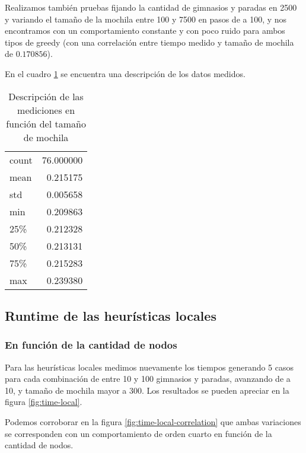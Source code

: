 Realizamos también pruebas fijando la cantidad de gimnasios y paradas en 2500 y variando el tamaño de la mochila entre 100 y 7500 en pasos de a 100, y nos encontramos con un comportamiento constante y con poco ruido para ambos tipos de greedy (con una correlación entre tiempo medido y tamaño de mochila de $0.170856$).

En el cuadro \ref{tab:time-greedy-moch} se encuentra una descripción de los datos medidos.

\begin{table}[H]
    \begin{center}
        \begin{tabular}{| l r |}
            \hline
            count  & 76.000000 \\
            mean   &  0.215175 \\
            std    &  0.005658 \\
            min    &  0.209863 \\
            25\%   &  0.212328 \\
            50\%   &  0.213131 \\
            75\%   &  0.215283 \\
            max    &  0.239380 \\
            \hline
        \end{tabular}
        \caption{Descripción de las mediciones en función del tamaño de mochila}\label{tab:time-greedy-moch}
    \end{center}
\end{table}

\subsection{Runtime de las heurísticas locales}

\subsubsection{En función de la cantidad de nodos}

Para las heurísticas locales medimos nuevamente los tiempos generando 5 casos para cada combinación de entre 10 y 100 gimnasios y paradas, avanzando de a 10, y tamaño de mochila mayor a 300. Los resultados se pueden apreciar en la figura \ref{fig:time-local}.

Podemos corroborar en la figura \ref{fig:time-local-correlation} que ambas variaciones se corresponden con un comportamiento de orden cuarto en función de la cantidad de nodos.

